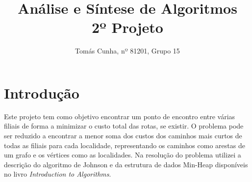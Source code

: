 \documentclass[12pt,a4paper,notitlepage]{article}
\begin{document}
\title{\textbf{Análise e Síntese de Algoritmos} \\\large 2º Projeto}
\date{}
\author{Tomás Cunha, nº 81201, Grupo 15}
\maketitle
\section{Introdução}
Este projeto tem como objetivo encontrar um ponto de encontro entre várias filiais de forma a minimizar o custo total das rotas, se existir.
O problema pode ser reduzido a encontrar a menor soma dos custos dos caminhos mais curtos de todas as filiais para cada localidade, representando os caminhos como arestas de um grafo e os vértices como as localidades.
Na resolução do problema utilizei a descrição do algoritmo de Johnson e da estrutura de dados Min-Heap disponíveis no livro \emph{Introduction to Algorithms}\cite{algs3ed}.
\end{document}
